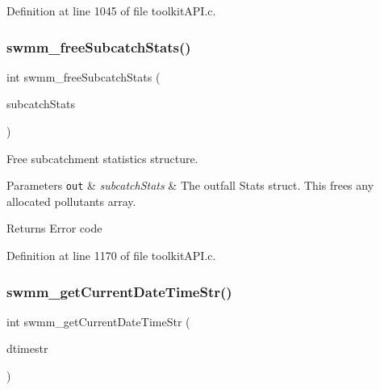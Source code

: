 Definition at line 1045 of file toolkit\+A\+P\+I.\+c.

\mbox{\label{group__tkfuncs_gaf24dfaf8bcd92298782f2449aa18a2f5}} 
\subsubsection{\texorpdfstring{swmm\+\_\+free\+Subcatch\+Stats()}{swmm\_freeSubcatchStats()}}
{\footnotesize\ttfamily int swmm\+\_\+free\+Subcatch\+Stats (\begin{DoxyParamCaption}\item[{\hyperlink{struct_s_m___subcatch_stats}{S\+M\+\_\+\+Subcatch\+Stats} $\ast$}]{subcatch\+Stats }\end{DoxyParamCaption})}



Free subcatchment statistics structure. 


\begin{DoxyParams}[1]{Parameters}
\mbox{\tt out}  & {\em subcatch\+Stats} & The outfall Stats struct. This frees any allocated pollutants array. \\
\hline
\end{DoxyParams}
\begin{DoxyReturn}{Returns}
Error code 
\end{DoxyReturn}


Definition at line 1170 of file toolkit\+A\+P\+I.\+c.

\mbox{\label{group__tkfuncs_ga1035b4f45546c1c90da4dafda7e3677d}} 
\subsubsection{\texorpdfstring{swmm\+\_\+get\+Current\+Date\+Time\+Str()}{swmm\_getCurrentDateTimeStr()}}
{\footnotesize\ttfamily int swmm\+\_\+get\+Current\+Date\+Time\+Str (\begin{DoxyParamCaption}\item[{char $\ast$}]{dtimestr }\end{DoxyParamCaption})}



